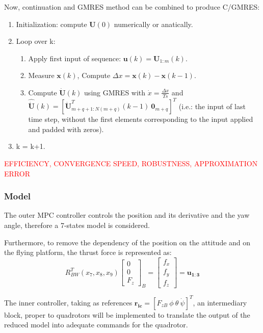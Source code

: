 \documentclass[a4paper, 12pt]{report}
\begin{document}
Now, continuation and GMRES method can be combined to produce C/GMRES:
\begin{enumerate}
\item Initialization: compute $\boldsymbol{U}(0)$ numerically or anatically.
\item Loop over k:
\begin{enumerate}
\item Apply first input of sequence: $\boldsymbol{u}(k) = \boldsymbol{U}_{1:m}(k)$.
\item Measure $\boldsymbol{x}(k)$, Compute $\Delta x = \boldsymbol{x}(k) - \boldsymbol{x}(k-1)$.
\item Compute $\boldsymbol{\dot U}(k)$ using GMRES with $\dot x = \frac{\Delta x}{Ts}$ and $\boldsymbol{\hat{\dot U}}(k) = [\boldsymbol{\dot U}^T_{m+q+1:N(m+q)}(k-1)\ \boldsymbol{0}_{m+q}]^T $ (i.e.: the input of last time step, without the first elements corresponding to the input applied and padded with zeros).
\end{enumerate}
\item k = k+1.
\end{enumerate}

\textcolor{red}{EFFICIENCY, CONVERGENCE SPEED, ROBUSTNESS, APPROXIMATION ERROR}


\subsubsection{Model}
The outer MPC controller controls the position and its derivative and the yaw angle, therefore a 7-states model is considered. 

Furthermore, to remove the dependency of the position on the attitude and on the flying platform, the thrust force is represented as:
\[ R_{BW}^T(x_7, x_8, x_9) \begin{bmatrix}  0\\ 0\\ F_z \end{bmatrix}_B = \begin{bmatrix}  f_x\\ f_y\\ f_z \end{bmatrix} = \boldsymbol{u_{1:3}}\]

The inner controller, taking as references $\boldsymbol{r_{ic}} = [F_{zB} \ \phi \  \theta \ \dot \psi]^T$, an intermediary block, proper to quadrotors will be implemented to translate the output of the reduced model into adequate commands for the quadrotor.
\end{document}
